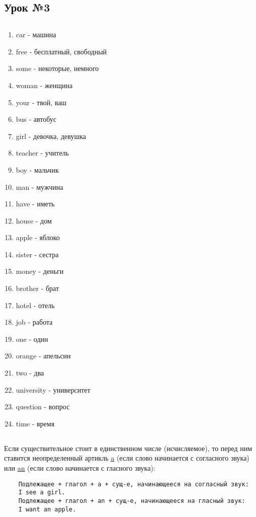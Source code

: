 \subsection{Урок №3}

\subsection*{}
\begin{multicols}{2}
    \begin{enumerate}\setlength{\itemsep}{0pt}
        \item car - машина
        \item free - бесплатный, свободный
        \item some - некоторые, немного
        \item woman - женщина
        \item your - твой, ваш
        \item bus - автобус
        \item girl - девочка, девушка
        \item teacher - учитель
        \item boy - мальчик
        \item man - мужчина
        \item have - иметь
        \item house - дом
        \item apple - яблоко
        \item sister - сестра
        \item money - деньги
        \item brother - брат
        \item hotel - отель
        \item job - работа
        \item one - один
        \item orange - апельсин
        \item two - два
        \item university - университет
        \item question - вопрос
        \item time - время
    \end{enumerate}
\end{multicols}

\subsection*{}
Если существительное стоит в единственном числе (исчисляемое), то перед ним ставится неопределенный
артикль \underline{a} (если слово начинается с согласного звука) или \underline{an} (если слово
начинается с гласного звука):
\begin{verbatim}
    Подлежащее + глагол + a + сущ-е, начинающееся на согласный звук:
    I see a girl.
    Подлежащее + глагол + an + сущ-е, начинающееся на гласный звук:
    I want an apple.
\end{verbatim}

